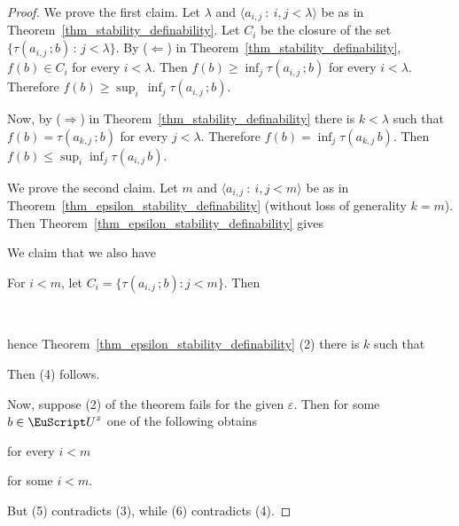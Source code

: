 \begin{proof}
  We prove the first claim.
  Let $\lambda$ and $\langle a_{i,j}\ :\ i,j<\lambda\rangle$ be as in Theorem~\ref{thm_stability_definability}.
  Let $C_i$ be the closure of the set $\{\tau(a_{i,j}\,;b)\,:\,j<\lambda\}$.
  By ($\Leftarrow$) in Theorem~\ref{thm_stability_definability}, $f(b)\in C_i$ for every $i<\lambda$.
  Then $f(b) \ge \inf_j \tau(a_{i,j}\,;b)$ for every $i<\lambda$.
  Therefore $f(b) \ge \sup_i\,\inf_j \tau(a_{i,j}\,;b)$.
 
  Now, by ($\Rightarrow$) in Theorem~\ref{thm_stability_definability} there is $k<\lambda$ such that $f(b) = \tau(a_{k,j}\,;b)$ for every $j<\lambda$.
  Therefore $f(b) = \inf_j \tau(a_{k,j}\,b)$.
  Then $f(b)\le \sup_i\inf_j \tau(a_{i,j}\,b)$.
  
  We prove the second claim.
  Let $m$ and $\langle a_{i,j}\ :\ i,j<m\rangle$ be as in Theorem~\ref{thm_epsilon_stability_definability} (without loss of generality $k=m$).
  Then Theorem~\ref{thm_epsilon_stability_definability} gives


  We claim that we also have


  For $i<m$, let $C_i=\{\tau(a_{i,j}\,;b):j<m\}$.
  Then 

  \

  hence Theorem~\ref{thm_epsilon_stability_definability} (2) there is $k$ such that
  

  Then (4) follows.

  Now, suppose (2) of the theorem fails for the given $\varepsilon$.
  Then for some $b\in{\EuScript U}^z$ one of the following obtains

  \hfill for every $i<m$\phantom{.}

  \hfill for some $i<m$.

But (5) contradicts (3), while (6) contradicts (4).
\end{proof}


